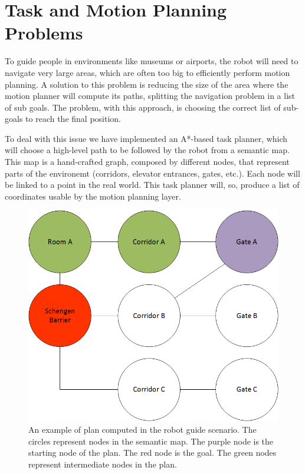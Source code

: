 \section{Task and Motion Planning Problems}
\label{sec:spencer-planning}
To guide people in environments like museums or airports, the robot will need to navigate very large areas, which are often too big to efficiently perform motion planning. A solution to this problem is reducing the size of the area where the motion planner will compute its paths, splitting the navigation problem in a list of sub goals. The problem, with this approach,  is choosing the correct list of sub-goals to reach the final position.  

To deal with this issue we have implemented an A*-based task planner, which will choose a high-level path to be followed by the robot from a semantic map. This map is a hand-crafted graph, composed by different nodes, that represent parts of the environemt (corridors, elevator entrances, gates, etc.). Each node will be linked to a point in the real world. This task planner will, so, produce a list of coordinates usable by the motion planning layer. 

\begin{figure}[ht!]
	\centering
	\includegraphics[scale=0.45]{img/case_study/spencer/ShengenTaskPlanner.png}
	\caption[Robot Guide Plan]{An example of plan computed in the robot guide scenario. The circles represent nodes in the semantic map. The purple node is the starting node of the plan. The red node is the goal. The green nodes represent intermediate nodes in the plan.}
	\label{fig:spencer-semantic_plan}
\end{figure}


